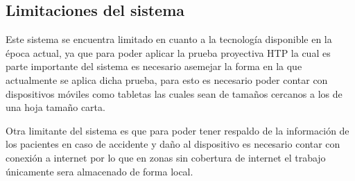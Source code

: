 \subsection{Limitaciones del sistema}

Este sistema se encuentra limitado en cuanto a la tecnología disponible en la época actual, ya que para poder aplicar la prueba proyectiva HTP la cual es parte importante del sistema es necesario asemejar la forma en la que actualmente se aplica dicha prueba, para esto es necesario poder contar con dispositivos móviles como tabletas las cuales sean de tamaños cercanos a los de una hoja tamaño carta.


Otra limitante del sistema es que para poder tener respaldo de la información de los pacientes en caso de accidente y daño al dispositivo es necesario contar con conexión a internet por lo que en zonas sin cobertura de internet el trabajo únicamente sera almacenado de forma local.
\newline